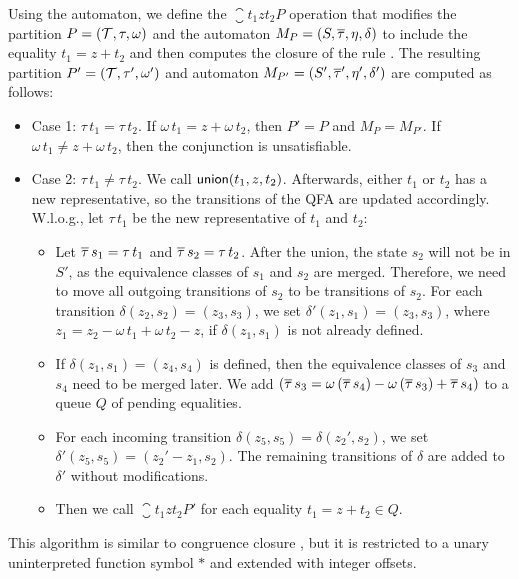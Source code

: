 Using the automaton, we define the $\closure{t_1}{z}{t_2}{P}$ operation that modifies the partition $P = (\mathcal{T}, \tau, \omega)$ and the automaton $M_P = (S, \overline{\tau}, \eta, \delta)$ to include the equality $t_1 = z + t_2$ and then computes the closure of the rule .
The resulting partition $P' = (\mathcal{T}, \tau', \omega')$ and automaton $M_{P'} = (S', \overline{\tau}', \eta', \delta')$  are computed as follows:
\begin{itemize}
  \item Case 1: $\tau\,t_1 = \tau\,t_2$. If $\omega\,t_1 = z + \omega\,t_2$, then $P' = P$ and $M_P = M_{P'}$.
        If $\omega\,t_1 \neq z + \omega\,t_2$, then the conjunction is unsatisfiable.
  \item Case 2: $\tau\,t_1 \neq \tau\,t_2$. We call $\textsf{union}(t_1, z, t_2)$.
        Afterwards, either $t_1$ or $t_2$ has a new representative, so the transitions of the QFA are updated accordingly.
        W.l.o.g., let $\tau\,t_1$ be the new representative of $t_1$ and $t_2$:
        \begin{itemize}
          \item Let $\overline{\tau}\,s_1 = \tau\,t_1$ and $\overline{\tau}\,s_2 = \tau\,t_2$.
                After the union, the state $s_2$ will not be in $S'$, as the equivalence classes of $s_1$ and $s_2$ are merged.
                Therefore, we need to move all outgoing transitions of $s_2$ to be transitions of $s_2$.
                For each transition $\delta(z_2, s_2) = (z_3, s_3)$, we set $\delta'(z_1, s_1) = (z_3, s_3)$, where $z_1 = z_2 - \omega\,t_1 + \omega\,t_2 - z$, if $\delta(z_1,s_1)$ is not already defined.
          \item If $\delta(z_1,s_1) = (z_4, s_4)$ is defined, then the equivalence classes of $s_3$ and $s_4$ need to be merged later.
                We add $(\overline{\tau}\,s_3 = \omega\,(\overline{\tau}\,s_4) - \omega\,(\overline{\tau}\,s_3) + \overline{\tau}\,s_4)$ to a queue $Q$ of pending equalities.
          \item For each incoming transition $\delta(z_5, s_5) = \delta(z_2', s_2)$, we set $\delta'(z_5, s_5) = (z_2' - z_1, s_2)$.
                The remaining transitions of $\delta$ are added to $\delta'$ without modifications.
          \item Then we call $\closure{t_1}{z}{t_2}{P'}$ for each equality $t_1 = z + t_2 \in Q$.
        \end{itemize}
\end{itemize}

This algorithm is similar to congruence closure \cite{cc-tarjan,cc-shostak}, but it is restricted to a unary uninterpreted function symbol $*$ and extended with integer offsets.

